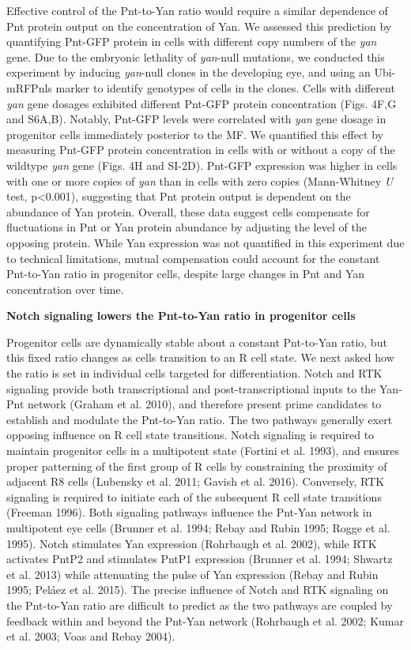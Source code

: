 Effective control of the Pnt-to-Yan ratio would require a similar dependence of Pnt protein output on the concentration of Yan. We assessed this prediction by quantifying Pnt-GFP protein in cells with different copy numbers of the \emph{yan} gene. Due to the embryonic lethality of \emph{yan}-null mutations, we conducted this experiment by inducing \emph{yan}-null clones in the developing eye, and using an Ubi-mRFPnls marker to identify genotypes of cells in the clones. Cells with different \emph{yan} gene dosages exhibited different Pnt-GFP protein concentration (Figs. 4F,G and S6A,B). Notably, Pnt-GFP levels were correlated with \emph{yan} gene dosage in progenitor cells immediately posterior to the MF. We quantified this effect by measuring Pnt-GFP protein concentration in cells with or without a copy of the wildtype \emph{yan} gene (Figs. 4H and SI-2D). Pnt-GFP expression was higher in cells with one or more copies of \emph{yan} than in cells with zero copies (Mann-Whitney \emph{U} test, p\textless{}0.001), suggesting that Pnt protein output is dependent on the abundance of Yan protein. Overall, these data suggest cells compensate for fluctuations in Pnt or Yan protein abundance by adjusting the level of the opposing protein. While Yan expression was not quantified in this experiment due to technical limitations, mutual compensation could account for the constant Pnt-to-Yan ratio in progenitor cells, despite large changes in Pnt and Yan concentration over time.

\textbf{Notch signaling lowers the Pnt-to-Yan ratio in progenitor cells}

Progenitor cells are dynamically stable about a constant Pnt-to-Yan ratio, but this fixed ratio changes as cells transition to an R cell state. We next asked how the ratio is set in individual cells targeted for differentiation. Notch and RTK signaling provide both transcriptional and post-transcriptional inputs to the Yan-Pnt network (Graham et al. 2010), and therefore present prime candidates to establish and modulate the Pnt-to-Yan ratio. The two pathways generally exert opposing influence on R cell state transitions. Notch signaling is required to maintain progenitor cells in a multipotent state (Fortini et al. 1993), and ensures proper patterning of the first group of R cells by constraining the proximity of adjacent R8 cells (Lubensky et al. 2011; Gavish et al. 2016). Conversely, RTK signaling is required to initiate each of the subsequent R cell state transitions (Freeman 1996). Both signaling pathways influence the Pnt-Yan network in multipotent eye cells (Brunner et al. 1994; Rebay and Rubin 1995; Rogge et al. 1995). Notch stimulates Yan expression (Rohrbaugh et al. 2002), while RTK activates PntP2 and stimulates PntP1 expression (Brunner et al. 1994; Shwartz et al. 2013) while attenuating the pulse of Yan expression (Rebay and Rubin 1995; Peláez et al. 2015). The precise influence of Notch and RTK signaling on the Pnt-to-Yan ratio are difficult to predict as the two pathways are coupled by feedback within and beyond the Pnt-Yan network (Rohrbaugh et al. 2002; Kumar et al. 2003; Voas and Rebay 2004).

